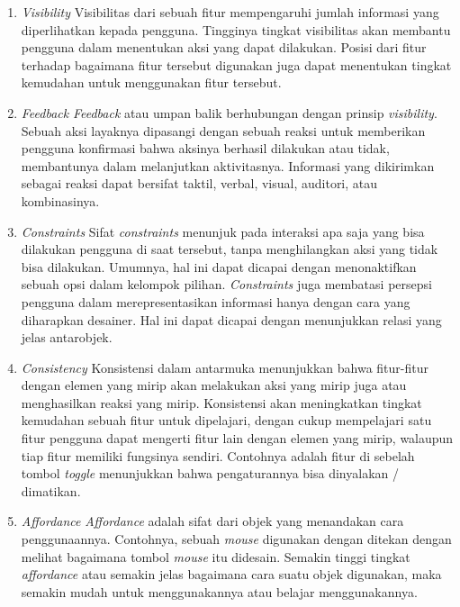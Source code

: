 \newpage

\begin{enumerate}
  \item \textit{Visibility}
  \subitem Visibilitas dari sebuah fitur mempengaruhi jumlah informasi yang diperlihatkan kepada pengguna. Tingginya tingkat visibilitas akan membantu pengguna dalam menentukan aksi yang dapat dilakukan. Posisi dari fitur terhadap bagaimana fitur tersebut digunakan juga dapat menentukan tingkat kemudahan untuk menggunakan fitur tersebut.
   
  \item \textit{Feedback}
  \subitem \textit{Feedback} atau umpan balik berhubungan dengan prinsip \textit{visibility}. Sebuah aksi layaknya dipasangi dengan sebuah reaksi untuk memberikan pengguna konfirmasi bahwa aksinya berhasil dilakukan atau tidak, membantunya dalam melanjutkan aktivitasnya. Informasi yang dikirimkan sebagai reaksi dapat bersifat taktil, verbal, visual, auditori, atau kombinasinya.
   
  \item \textit{Constraints}
  \subitem Sifat \textit{constraints} menunjuk pada interaksi apa saja yang bisa dilakukan pengguna di saat tersebut, tanpa menghilangkan aksi yang tidak bisa dilakukan. Umumnya, hal ini dapat dicapai dengan menonaktifkan sebuah opsi dalam kelompok pilihan. \textit{Constraints} juga membatasi persepsi pengguna dalam merepresentasikan informasi hanya dengan cara yang diharapkan desainer. Hal ini dapat dicapai dengan menunjukkan relasi yang jelas antarobjek.
   
  \item \textit{Consistency}
  \subitem Konsistensi dalam antarmuka menunjukkan bahwa fitur-fitur dengan elemen yang mirip akan melakukan aksi yang mirip juga atau menghasilkan reaksi yang mirip. Konsistensi akan meningkatkan tingkat kemudahan sebuah fitur untuk dipelajari, dengan cukup mempelajari satu fitur pengguna dapat mengerti fitur lain dengan elemen yang mirip, walaupun tiap fitur memiliki fungsinya sendiri. Contohnya adalah fitur di sebelah tombol \textit{toggle} menunjukkan bahwa pengaturannya bisa dinyalakan / dimatikan.
   
  \item \textit{Affordance}
  \subitem \textit{Affordance} adalah sifat dari objek yang menandakan cara penggunaannya. Contohnya, sebuah \textit{mouse} digunakan dengan ditekan dengan melihat bagaimana tombol \textit{mouse} itu didesain. Semakin tinggi tingkat \textit{affordance} atau semakin jelas bagaimana cara suatu objek digunakan, maka semakin mudah untuk menggunakannya atau belajar menggunakannya.
   
\end{enumerate}

